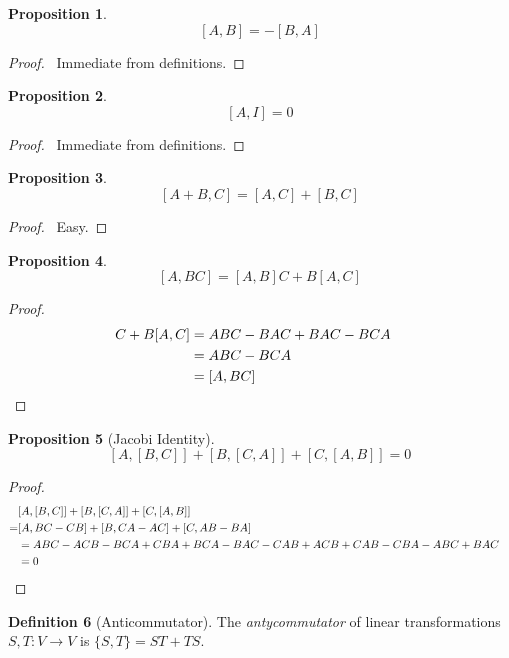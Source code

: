 \documentclass{book}
\let\qed\relax
\newtheorem{prop}{Proposition}[chapter]
\theoremstyle{definition}
\newtheorem{df}[prop]{Definition}
\begin{document}
\begin{prop}
\[ [A,B] = -[B,A] \]
\end{prop}

\begin{proof}
\pf\ Immediate from definitions. \qed
\end{proof}

\begin{prop}
\[ [A,I] = 0 \]
\end{prop}

\begin{proof}
\pf\ Immediate from definitions. \qed
\end{proof}

\begin{prop}
\[ [A + B, C] = [A,C] + [B,C] \]
\end{prop}

\begin{proof}
\pf\ Easy. \qed
\end{proof}

\begin{prop}
\[ [A,BC] = [A,B]C + B[A,C] \]
\end{prop}

\begin{proof}
\pf
\begin{align*}
[A,B]C + B[A,C] & = ABC - BAC + BAC - BCA \\
& = ABC - BCA \\
& = [A,BC] & \qed
\end{align*}
\end{proof}

\begin{prop}[Jacobi Identity]
\[ [A,[B,C]] + [B, [C,A]] + [C, [A,B]] = 0 \]
\end{prop}

\begin{proof}
\pf
\begin{align*}
& [A,[B,C]] + [B,[C,A]] + [C,[A,B]] \\
= & [A,BC-CB] + [B,CA-AC] + [C,AB-BA] \\
& = ABC - ACB - BCA + CBA + BCA - BAC - CAB + ACB + CAB - CBA - ABC + BAC \\
& = 0 & \qed
\end{align*}
\end{proof}

\begin{df}[Anticommutator]
The \emph{antycommutator} of linear transformations $S,T : V \rightarrow V$ is $\{ S,T \} = ST + TS$.
\end{df}
\end{document}
